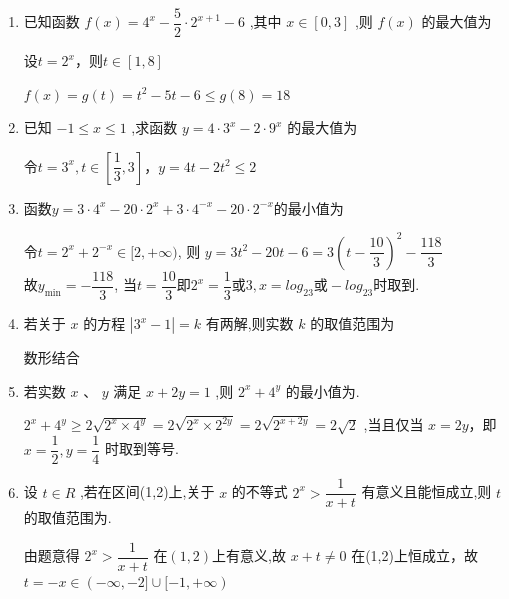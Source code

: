 \begin{enumerate}
\begin{jieda}
        $g(x) = \dfrac{5}{3} - \dfrac{2}{1+2^x}$，$x \in \mathbf{R}$，$2^x = (0, +\infty)$，$1+2^x \in (1, +\infty)$，$\dfrac{1}{1+2^x} \in (0, 1)$，$\dfrac{2}{1+2^x} \in (0, 2)$，$g(x) \in \left(-\dfrac{1}{3}, \dfrac{5}{3}\right)$

        故$f(x) \in \{-1, 0, 1\}$
    \end{jieda}
    \item 已知函数 $f\left( x\right)  = {4}^{x} - \dfrac{5}{2} \cdot  {2}^{x + 1} - 6$ ,其中 $x \in  \left\lbrack  {0,3}\right\rbrack$ ,则 $f\left( x\right)$ 的最大值为
    \begin{jieda}
        设$t = 2^x$，则$t \in [1, 8]$
        
        $f(x) = g(t) = t^2-5t-6 \leq g(8) = 18$
    \end{jieda}

    \item 已知 $- 1 \leq  x \leq  1$ ,求函数 $y = 4 \cdot  {3}^{x} - 2 \cdot  {9}^{x}$ 的最大值为
    \begin{jieda}
        令$t = 3^x, t \in \left[\dfrac{1}{3}, 3\right]$，$y = 4t-2t^2 \leq 2$
    \end{jieda}
  
    \item 函数$y=3\cdot4^x-20\cdot2^x+3\cdot4^{-x}-20\cdot2^{-x}$的最小值为 
    \begin{jieda}
    令$t=2^x+2^{-x}\in[2,+\infty)$, 则
    $y = 3t^2-20t-6 = 3(t-\dfrac{10}{3})^2-\dfrac{118}{3}$ \\
    故$y_{\min}=-\dfrac{118}{3}$, 当$t=\dfrac{10}{3}$即$2^x = \dfrac{1}{3}\mbox{或}3, x=log_23 \mbox{或}-log_23$时取到. 
    \end{jieda}
    \item 若关于 $x$ 的方程 $\left| {{3}^{x} - 1}\right|  = k$ 有两解,则实数 $k$ 的取值范围为
    \begin{jieda}
        数形结合
    \end{jieda}
    
    \item 若实数 $x$ 、 $y$ 满足 $x + {2y} = 1$ ,则 ${2}^{x} + {4}^{y}$ 的最小值为.
    \begin{jieda}
        ${2}^{x} + {4}^{y} \geq  2\sqrt{{2}^{x} \times  {4}^{y}} = 2\sqrt{{2}^{x} \times  {2}^{2y}} = 2\sqrt{{2}^{x + {2y}}} = 2\sqrt{2}$ ,当且仅当 $x = {2y}$，即 $x = \dfrac{1}{2},y = \dfrac{1}{4}$ 时取到等号.
    \end{jieda}
    \item 设 $t \in  {R}$ ,若在区间(1,2)上,关于 $x$ 的不等式 ${2}^{x} > \dfrac{1}{x + t}$ 有意义且能恒成立,则 $t$ 的取值范围为.
    \begin{jieda}
        由题意得 ${2}^{x} > \dfrac{1}{x + t}$ 在$(1,2)$上有意义,故 $x + t \neq  0$ 在(1,2)上恒成立，故 $t =  - x \in  \left( {-\infty , - 2\rbrack \cup \lbrack  - 1, + \infty }\right)$ 


\end{jieda}
\end{enumerate}
